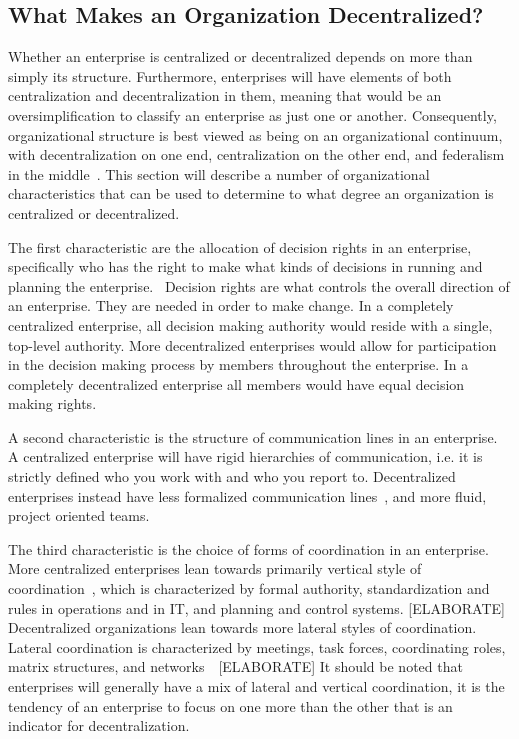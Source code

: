 \subsection{What Makes an Organization Decentralized?}
Whether an enterprise is centralized or decentralized depends on more than simply its structure. Furthermore, enterprises will have elements of both centralization and decentralization in them, meaning that would be an oversimplification to classify an enterprise as just one or another. Consequently, organizational structure is best viewed as being on an organizational continuum, with decentralization on one end, centralization on the other end, and federalism in the middle~\cite{pearlson2009}. This section will describe a number of organizational characteristics that can be used to determine to what degree an organization is centralized or decentralized. 

The first characteristic are the allocation of decision rights in an enterprise, specifically who has the right to make what kinds of decisions in running and planning the enterprise.~\cite{pearlson2009} Decision rights are what controls the overall direction of an enterprise. They are needed in order to make change. In a completely centralized enterprise, all decision making authority would reside with a single, top-level authority. More decentralized enterprises would allow for participation in the decision making process by members throughout the enterprise. In a completely decentralized enterprise all members would have equal decision making rights. 

A second characteristic is the structure of communication lines in an enterprise. A centralized enterprise will have rigid hierarchies of communication, i.e. it is strictly defined who you work with and who you report to. Decentralized enterprises instead have less formalized communication lines~\cite{pearlson2009}, and more fluid, project oriented teams.~\cite{applegate1988}

The third characteristic is the choice of forms of coordination in an enterprise. More centralized enterprises lean towards primarily vertical style of coordination~\cite{Bolman2008}, which is characterized by formal authority, standardization and rules in operations and in IT, and planning and control systems. [ELABORATE] Decentralized organizations lean towards more lateral styles of coordination. Lateral coordination is characterized by meetings, task forces, coordinating roles, matrix structures, and networks~~\cite{Bolman2008}[ELABORATE] It should be noted that enterprises will generally have a mix of lateral and vertical coordination, it is the tendency of an enterprise to focus on one more than the other that is an indicator for decentralization.

